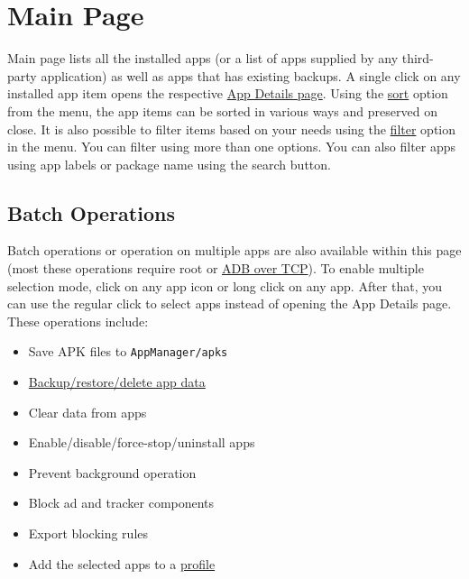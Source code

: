 \section{Main Page}\label{sec:main-page} %
Main page lists all the installed apps (or a list of apps supplied by any third-party application) as well as apps that
has existing backups. A single click on any installed app item opens the respective \hyperref[sec:app-details-page]{App
Details page}. Using the \hyperlink{par:main-page-sort}{sort} option from the menu, the app items can be sorted in
various ways and preserved on close. It is also possible to filter items based on your needs using the
\hyperlink{par:main-page-filter}{filter} option in the menu. You can filter using more than one options. You can also
filter apps using app labels or package name using the search button.

\subsection{Batch Operations}\label{subsec:batch-operations} %
Batch operations or operation on multiple apps are also available within this page (most these operations require root
or \hyperref[sec:adb-over-tcp]{ADB over TCP}). To enable multiple selection mode, click on any app icon or long click
on any app. After that, you can use the regular click to select apps instead of opening the App Details page. These
operations include:
\begin{itemize}
    \item Save APK files to \texttt{AppManager/apks}
    \item \hyperref[sec:backup-restore]{Backup/restore/delete app data}
    \item Clear data from apps
    \item Enable/disable/force-stop/uninstall apps
    \item Prevent background operation
    \item Block ad and tracker components
    \item Export blocking rules
    \item Add the selected apps to a \hyperref[sec:profiles-page]{profile}
\end{itemize}

